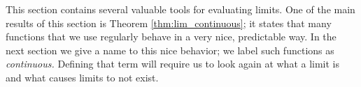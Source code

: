 This section contains several valuable tools for evaluating limits. One of the main results of this section is Theorem \ref{thm:lim_continuous}; it states that many functions that we use regularly behave in a very nice, predictable way. In the next section we give a name to this nice behavior; we label such functions as \textit{continuous.} Defining that term will require us to look again at what a limit is and what causes limits to not exist.

{}